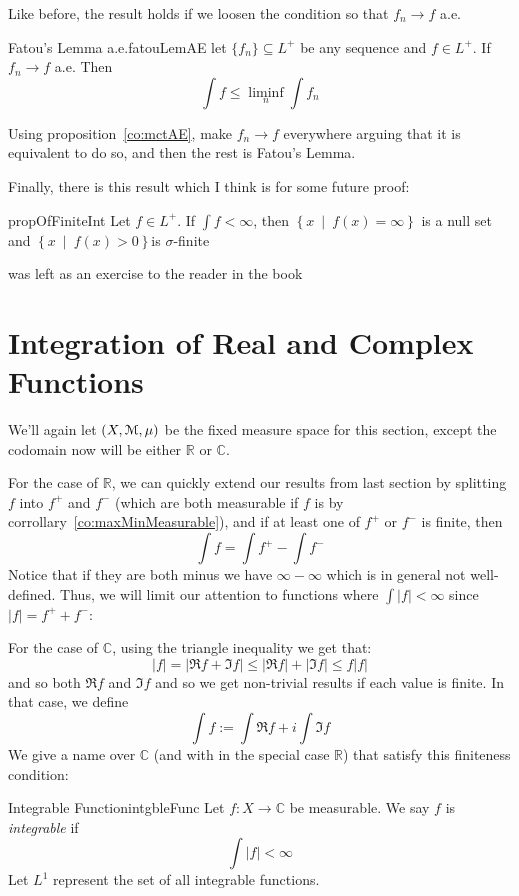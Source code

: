 \documentclass[oneside]{book}
\newcommand{\R}{\mathbb{R}}
\renewcommand{\C}{\mathbb{C}}
\newcommand{\EM}{\EuScript{M}}
\newcommand{\sse}{\subseteq}
\newcommand{\set}[2]{\left\{#1 \ \middle|\ #2\right\}}
\newcommand{\rw}{\rightarrow}
\begin{document}
Like before, the result holds if we loosen the condition so that $f_n \rw f$ a.e.

\begin{cor}{Fatou's Lemma a.e.}{fatouLemAE}
	let $\{f_n\} \sse L^+$ be any sequence and $f \in L^+$. If $f_n \rw f$ a.e. Then
	\[
		\int f \le \liminf_n \int f_n
	\]
\end{cor}

\begin{Proof}
	Using proposition~\ref{co:mctAE}, make  $f_n \rw f$ everywhere arguing that it is equivalent to do so, and then the
	rest is Fatou's Lemma. 
\end{Proof}

Finally, there is this result which I think is for some future proof:

\begin{prop}{}{propOfFiniteInt}
	Let $f \in L^+$. If $\int f < \infty$, then $\set{x}{f(x) = \infty}$ is a null set and $\set{x}{f(x) > 0}$is
	$\sigma$-finite
\end{prop}

\begin{Proof}
	was left as an exercise to the reader in the book
\end{Proof}


\section{Integration of Real and Complex Functions}

We'll again let $(X, \EM, \mu)$ be the fixed measure space for this section, except the codomain now will be either $\R$
or $\C$. 

For the case of $\R$, we can quickly extend our results from last section by splitting $f$ into $f^+$ and $f^-$ (which
are both measurable if $f$ is by corrollary~\ref{co:maxMinMeasurable}), and if at least one of $f^+$ or $f^-$ is finite,
then
\[
	\int f = \int f^+ -\int f^-
\]
Notice that if they are both minus we have $\infty - \infty$ which is in general not well-defined. Thus, we will limit
our attention to functions where $\int |f| < \infty$ since $|f| = f^+ + f^-$:

For the case of $\C$,  using the triangle inequality we get that:
\[
	|f| = |\Re f + \Im f| \le |\Re f| + |\Im f| \le f|f|
\]
and so both $\Re f$ and $\Im f$ and so we get non-trivial results if each value is finite. In that case, we define
\[
	\int f := \int \Re f + i\int \Im f
\]
We give a name over $\C$ (and with in the special case $\R$) that satisfy this finiteness condition:
\begin{defn}{Integrable Function}{intgbleFunc}
	Let $f:X \rw \C$ be measurable. We say $f$ is \emph{integrable} if 
	\[
		\int |f| < \infty
	\]
	Let $L^1$ represent the set of all integrable functions. 
\end{defn}
\end{document}
